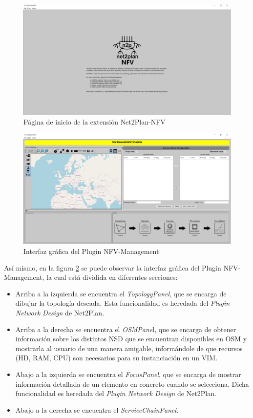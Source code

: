 \begin{figure}[!ht]
	\centering
	\includegraphics[width=0.8\linewidth]{imagenes/nfvpluginmain}
	\caption{Página de inicio de la extensión Net2Plan-NFV}
	\label{fig:nfvpluginmain}
\end{figure}


\begin{figure}[!ht]
	\centering
	\includegraphics[width=0.8\linewidth]{imagenes/nfvplugin_dashboard}
	\caption{Interfaz gráfica del Plugin NFV-Management}
	\label{fig:nfvplugindash}
\end{figure}

Así mismo, en la figura \ref{fig:nfvplugindash} se puede observar la interfaz gráfica del Plugin NFV-Management, la cual está dividida en diferentes secciones:

\begin{itemize}
	\item Arriba a la izquierda se encuentra el \textit{TopologyPanel}, que se encarga de dibujar la topología deseada. Esta funcionalidad es heredada del \textit{Plugin Network Design} de Net2Plan.
	
	\item Arriba a la derecha se encuentra el \textit{OSMPane}l, que se encarga de obtener información sobre los distintos NSD que se encuentran disponibles en OSM y mostrarla al usuario de una manera amigable, informándole de que recursos (HD, RAM, CPU) son necesarios para su instanciación en un VIM.
	
	\item Abajo a la izquierda se encuentra el \textit{FocusPanel}, que se encarga de mostrar información detallada de un elemento en concreto cuando se selecciona. Dicha funcionalidad es heredada del \textit{Plugin Network Design} de Net2Plan.
	
	\item Abajo a la derecha se encuentra el \textit{ServiceChainPanel}.
\end{itemize}




\cleardoublepage